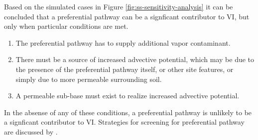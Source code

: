 \documentclass[journal=esthag,manuscript=article]{achemso}
\begin{document}
Based on the simulated cases in Figure \ref{fig:ss-sensitivity-analysis} it can be concluded that a preferential pathway can be a signficant contributor to VI, but only when particular conditions are met.
\begin{enumerate}
  \item The preferential pathway has to supply additional vapor contaminant.
  \item There must be a source of increased advective potential, which may be due to the presence of the preferential pathway itself, or other site features, or simply due to more permeable surrounding soil.
  \item A permeable sub-base must exist to realize increased advective potential.
\end{enumerate}
In the absense of any of these conditions, a preferential pathway is unlikely to be a signficant contributor to VI.
Strategies for screening for preferential pathway are discussed by \citeauthor{nielsen_remediation_2017}\cite{nielsen_remediation_2017}. \par
\end{document}
